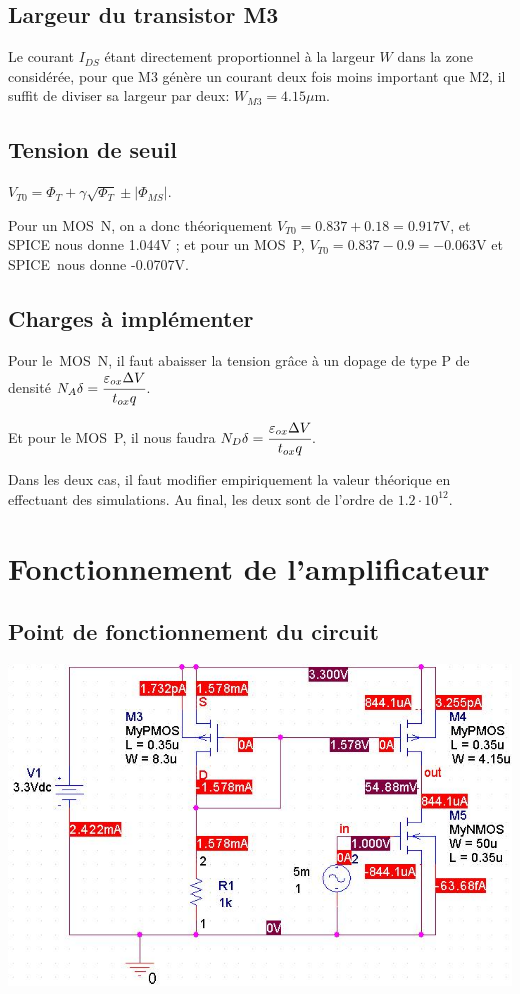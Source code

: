 \documentclass[10pt]{article}
\begin{document}
   \subsection{Largeur du transistor M3}
    Le courant $I_{DS}$ étant directement proportionnel à la largeur $W$ dans la
    zone considérée, pour que M3 génère un courant deux fois moins important que
    M2, il suffit de diviser sa largeur par deux: $W_{M3}=4.15\mu$m.

   \subsection{Tension de seuil}
    $V_{T0} = \Phi_T + \gamma \sqrt{\Phi_T} \pm \lvert \Phi_{MS} \rvert$.

    Pour un MOS N, on a donc théoriquement $V_{T0} = 0.837+0.18 = 0.917$V, et
    SPICE nous donne 1.044V ; et pour un MOS P, $V_{T0} = 0.837-0.9 = -0.063$V
    et SPICE nous donne -0.0707V.

   \subsection{Charges à implémenter}
    Pour le MOS N, il faut abaisser la tension grâce à un dopage de type P de
    densité $N_A \delta = \cfrac{\varepsilon_{ox} \Delta V}{t_{ox} q}$.

    Et pour le MOS P, il nous faudra $N_D \delta = \cfrac{\varepsilon_{ox}
    \Delta V}{t_{ox} q}$.

    Dans les deux cas, il faut modifier empiriquement la valeur théorique en
    effectuant des simulations. Au final, les deux sont de l’ordre de $1.2\cdot
    10^{12}$.

  \section{Fonctionnement de l’amplificateur}
   \subsection{Point de fonctionnement du circuit}
    \begin{center}
     \includegraphics[width=16cm]{II-III-a_bias-point_circuit-et-valeurs.jpg}
    \end{center}
\end{document}
